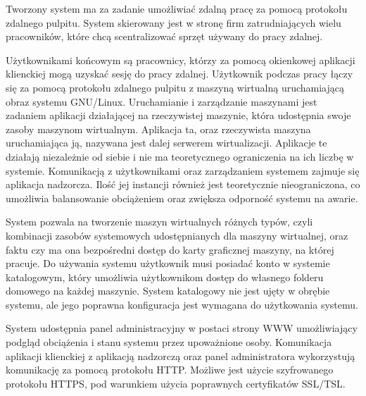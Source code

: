 \documentclass[../wstep.tex]{subfiles}
\begin{document}
Tworzony system ma za zadanie umożliwiać zdalną pracę za pomocą protokołu zdalnego pulpitu. System skierowany jest w stronę firm zatrudniających wielu pracowników, które chcą scentralizować sprzęt używany do pracy zdalnej.

Użytkownikami końcowym są pracownicy, którzy za pomocą okienkowej aplikacji klienckiej mogą uzyskać sesję do pracy zdalnej. Użytkownik podczas pracy łączy się za pomocą protokołu zdalnego pulpitu z maszyną wirtualną uruchamiającą obraz systemu GNU/Linux. Uruchamianie i zarządzanie maszynami jest zadaniem aplikacji działającej na rzeczywistej maszynie, która udostępnia swoje zasoby maszynom wirtualnym. Aplikacja ta, oraz rzeczywista maszyna uruchamiająca ją, nazywana jest dalej serwerem wirtualizacji. Aplikacje te działają niezależnie od siebie i nie ma teoretycznego ograniczenia na ich liczbę w systemie. Komunikacją z użytkownikami oraz zarządzaniem systemem zajmuje się aplikacja nadzorcza. Ilość jej instancji również jest teoretycznie nieograniczona, co umożliwia balansowanie obciążeniem oraz zwiększa odporność systemu na awarie.

System pozwala na tworzenie maszyn wirtualnych różnych typów, czyli kombinacji zasobów systemowych udostępnianych dla maszyny wirtualnej, oraz faktu czy ma ona bezpośredni dostęp do karty graficznej maszyny, na której pracuje. Do używania systemu użytkownik musi posiadać konto w systemie katalogowym, który umożliwia użytkownikom dostęp do własnego folderu domowego na każdej maszynie. System katalogowy nie jest ujęty w obrębie systemu, ale jego poprawna konfiguracja jest wymagana do użytkowania systemu.

System udostępnia panel administracyjny w postaci strony WWW umożliwiający podgląd obciążenia i stanu systemu przez upoważnione osoby. Komunikacja aplikacji klienckiej z aplikacją nadzorczą oraz panel administratora wykorzystują komunikację za pomocą protokołu HTTP. Możliwe jest użycie szyfrowanego protokołu HTTPS, pod warunkiem użycia poprawnych certyfikatów SSL/TSL.
\end{document}
